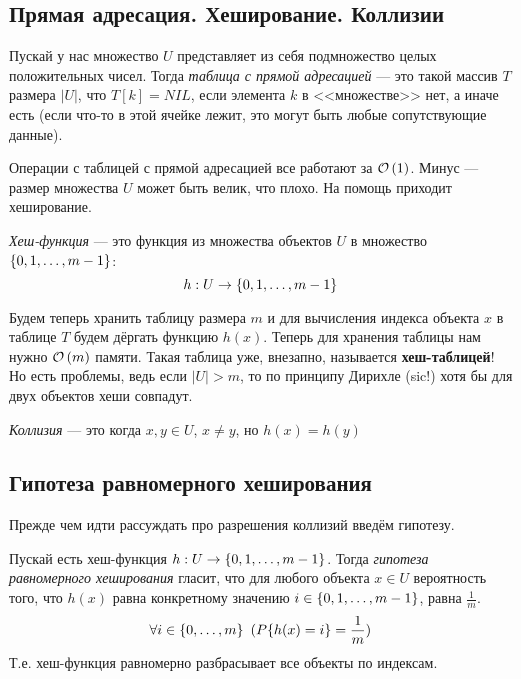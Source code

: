 \subsection{Прямая адресация. Хеширование. Коллизии}
\begin{defn}
Пускай у нас множество $U$ представляет из себя подмножество целых положительных чисел. Тогда \emph{таблица с прямой адресацией} --- это такой массив $T$ размера $|U|$, что $T[k] = NIL$, если элемента $k$ в <<множестве>> нет, а иначе есть (если что-то в этой ячейке лежит, это могут быть любые сопутствующие данные).
\end{defn}
Операции с таблицей с прямой адресацией все работают за $\mathcal{O}\left(1\right)$. Минус --- размер множества $U$ может быть велик, что плохо. На помощь приходит хеширование.
\begin{defn}
\emph{Хеш-функция} --- это функция из множества объектов $U$ в множество $\left\lbrace 0, 1, \ldots, m - 1 \right\rbrace$:
\[
    h: U \to \left\lbrace 0, 1, \ldots, m - 1 \right\rbrace
\]
\end{defn}
Будем теперь хранить таблицу размера $m$ и для вычисления индекса объекта $x$ в таблице $T$ будем дёргать функцию $h(x)$. Теперь для хранения таблицы нам нужно $\mathcal{O}\left(m\right)$ памяти. Такая таблица уже, внезапно, называется \textbf{хеш-таблицей}! Но есть проблемы, ведь если $|U| > m$, то по принципу Дирихле (sic!) хотя бы для двух объектов хеши совпадут.
\begin{defn}
\emph{Коллизия} --- это когда $x, y \in U$, $x \neq y$, но $h(x) = h(y)$
\end{defn}
\subsection{Гипотеза равномерного хеширования}
Прежде чем идти рассуждать про разрешения коллизий введём гипотезу.
\begin{defn}
Пускай есть хеш-функция $h: U \to \left\lbrace 0, 1, \ldots, m-1 \right\rbrace$. Тогда \emph{гипотеза равномерного хеширования} гласит, что для любого объекта $x \in U$ вероятность того, что $h(x)$ равна конкретному значению $i \in  \left\lbrace 0, 1, \ldots, m-1 \right\rbrace$, равна $\frac{1}{m}$. 
\[
    \forall i \in \xbrace{0, \ldots, m}\ (P\{h(x) = i\} = \frac{1}{m})
\]
Т.е. хеш-функция равномерно разбрасывает все объекты по индексам.
\end{defn}
